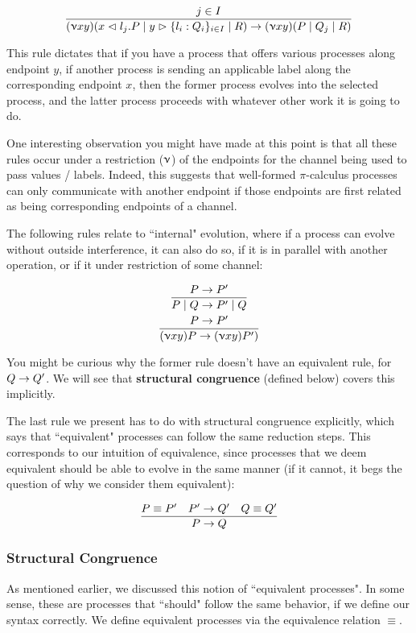 $$\frac{j \in I}{(\upnu xy)(x \vartriangleleft l_j . P \mid y \vartriangleright \{l_i : Q_i\}_{i \in I} \mid R) \rightarrow (\upnu xy)(P \mid Q_j \mid R)}$$

This rule dictates that if you have a process that offers various processes along endpoint $y$, if another process is sending an applicable label along the corresponding endpoint $x$, then the former process evolves into the selected process, and the latter process proceeds with whatever other work it is going to do.

One interesting observation you might have made at this point is that all these rules occur under a restriction ($\upnu$) of the endpoints for the channel being used to pass values / labels. Indeed, this suggests that well-formed $\pi$-calculus processes can only communicate with another endpoint if those endpoints are first related as being corresponding endpoints of a channel.

The following rules relate to ``internal" evolution, where if a process can evolve without outside interference, it can also do so, if it is in parallel with another operation, or if it under restriction of some channel:

\begin{gather*}
\frac{P \rightarrow P'}{P \mid Q \rightarrow P' \mid Q} \\
\frac{P \rightarrow P'}{(\upnu xy)P \rightarrow (\upnu xy) P')}
\end{gather*}

You might be curious why the former rule doesn't have an equivalent rule, for $Q \rightarrow Q'$. We will see that \textbf{structural congruence} (defined below) covers this implicitly.

The last rule we present has to do with structural congruence explicitly, which says that ``equivalent" processes can follow the same reduction steps. This corresponds to our intuition of equivalence, since processes that we deem equivalent should be able to evolve in the same manner (if it cannot, it begs the question of why we consider them equivalent):

$$
\frac{P \equiv P' \quad P' \rightarrow Q' \quad Q \equiv Q'}{P \rightarrow Q}
$$

\subsubsection{Structural Congruence}
As mentioned earlier, we discussed this notion of ``equivalent processes". In some sense, these are processes that ``should" follow the same behavior, if we define our syntax correctly. We define equivalent processes via the equivalence relation $\equiv$.

